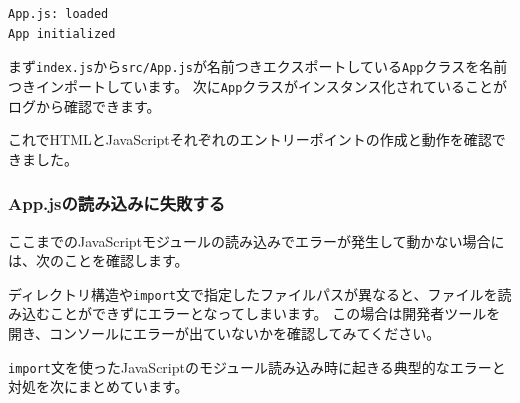 \begin{lstlisting}
App.js: loaded
App initialized
\end{lstlisting}

まず\texttt{index.js}から\texttt{src/App.js}が名前つきエクスポートしている\texttt{App}クラスを名前つきインポートしています。
次に\texttt{App}クラスがインスタンス化されていることがログから確認できます。

これでHTMLとJavaScriptそれぞれのエントリーポイントの作成と動作を確認できました。

\hypertarget{error-import-app-js}{%
\subsubsection{App.jsの読み込みに失敗する}\label{error-import-app-js}}

ここまでのJavaScriptモジュールの読み込みでエラーが発生して動かない場合には、次のことを確認します。

ディレクトリ構造や\texttt{import}文で指定したファイルパスが異なると、ファイルを読み込むことができずにエラーとなってしまいます。
この場合は開発者ツールを開き、コンソールにエラーが出ていないかを確認してみてください。

\texttt{import}文を使ったJavaScriptのモジュール読み込み時に起きる典型的なエラーと対処を次にまとめています。

